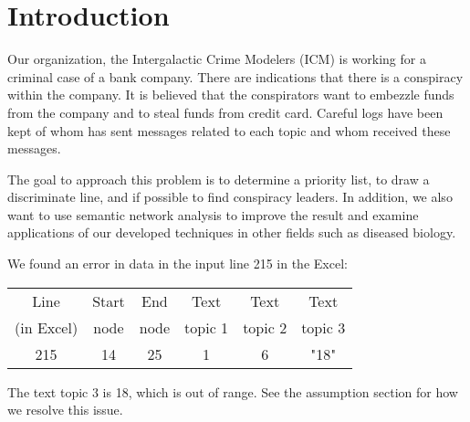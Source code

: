 \documentclass{icmmcm}
\begin{document}


\maketitle
\tableofcontents

\listoffigures
\listoftables  
 

\section{Introduction}%
\label{sec:introduction}


Our organization, the Intergalactic Crime Modelers (ICM) is working
for a criminal case of a bank company. 
There are indications that there is a conspiracy within the company. 
It is believed that the conspirators want to embezzle funds from
the company and to steal funds from credit card.
Careful logs have been kept of whom has sent messages related to each
topic and whom received these messages.

The goal to approach this problem is to determine a priority list, 
to draw a discriminate line, and if possible to find
conspiracy leaders. In addition, we also want to use semantic
network analysis to improve the result and examine applications of
our developed techniques in other fields such as diseased biology.


We found an error in data in the input line 215 in the Excel:

\begin{center}	  	
\begin{tabular}{|c|c|c|c|c|c|}	  	
\hline	  	
Line    & Start  & End  & Text   & Text       & Text \\	  	
(in Excel)&  node & node & topic 1 &  topic 2 & topic 3 \\	  	
\hline  	
215 &  14 & 25 &  1  &   6      &      "18"  \\  	
\hline  	
\end{tabular}  	
\end{center}

The text topic 3 is 18, which is out of range.
See the assumption section for how we resolve this issue.
\end{document}
